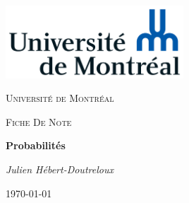 \documentclass[french, babel]{article}
\begin{document}
\begin{titlepage}
	\centering
	\includegraphics[width=0.5\textwidth]{Universite_de_Montreal_logo}\par\vspace{1cm}
	{\scshape\LARGE Université de Montréal\par}
	\vspace{1cm}
	{\scshape\Large Fiche De Note\par}
	\vspace{1.5cm}
	{\huge\bfseries Probabilités \par}
	\vspace{2cm}
	{\Large\itshape Julien Hébert-Doutreloux\par}
	\vfill
	\vfill
	{\large \today\par}
\end{titlepage}
\tableofcontents
\newpage


\end{document}
